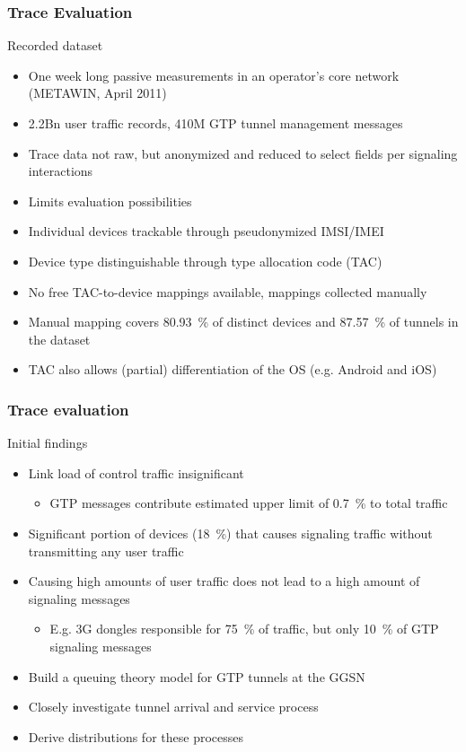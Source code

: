 \documentclass{beamer}
\begin{document}
\begin{frame}
	\frametitle{Trace Evaluation}
	Recorded dataset
	\begin{itemize}
		\item One week long passive measurements in an operator's core network (METAWIN, April 2011)
		\item 2.2Bn user traffic records, 410M GTP tunnel management messages
		\item Trace data not raw, but anonymized and reduced to select fields per signaling interactions
		\item Limits evaluation possibilities 
	\end{itemize}

	\begin{itemize}[<2->]
		\item Individual devices trackable through pseudonymized IMSI/IMEI
		\item Device type distinguishable through type allocation code (TAC)
		\item No free TAC-to-device mappings available, mappings collected manually
		\item Manual mapping covers \SI{80.93}{\percent} of distinct devices and \SI{87.57}{\percent} of tunnels in the dataset
		\item TAC also allows (partial) differentiation of the OS (e.g. Android and iOS)
	\end{itemize}
\end{frame}


\begin{frame}
	\frametitle{Trace evaluation}

	Initial findings
	\begin{itemize}
		\item Link load of control traffic insignificant
			\begin{itemize}
				\item GTP messages contribute estimated upper limit of \SI{0.7}{\percent} to total traffic
			\end{itemize}
		\item Significant portion of devices (\SI{18}{\percent}) that causes signaling traffic without transmitting any user traffic
		\item Causing high amounts of user traffic does not lead to a high amount of signaling messages
			\begin{itemize}
				\item E.g. 3G dongles responsible for \SI{75}{\percent} of traffic, but only \SI{10}{\percent} of GTP signaling messages
			\end{itemize}
	\end{itemize}

	\begin{itemize}[<2->]
		\item Build a queuing theory model for GTP tunnels at the GGSN
		\item Closely investigate tunnel arrival and service process
		\item Derive distributions for these processes
	\end{itemize}
\end{frame}
\end{document}
